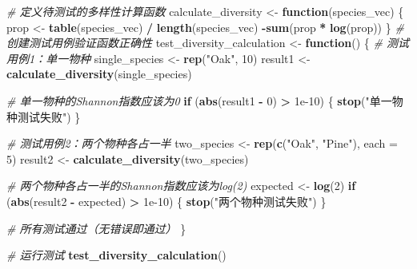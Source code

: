 \documentclass[
  twoside,12pt,fontset=none]{ctexbook}
\newenvironment{Shaded}{\begin{snugshade}}{\end{snugshade}}
\newcommand{\AttributeTok}[1]{\textcolor[rgb]{0.13,0.29,0.53}{#1}}
\newcommand{\CommentTok}[1]{\textcolor[rgb]{0.56,0.35,0.01}{\textit{#1}}}
\newcommand{\ControlFlowTok}[1]{\textcolor[rgb]{0.13,0.29,0.53}{\textbf{#1}}}
\newcommand{\DecValTok}[1]{\textcolor[rgb]{0.00,0.00,0.81}{#1}}
\newcommand{\FloatTok}[1]{\textcolor[rgb]{0.00,0.00,0.81}{#1}}
\newcommand{\FunctionTok}[1]{\textcolor[rgb]{0.13,0.29,0.53}{\textbf{#1}}}
\newcommand{\NormalTok}[1]{#1}
\newcommand{\OtherTok}[1]{\textcolor[rgb]{0.56,0.35,0.01}{#1}}
\newcommand{\SpecialCharTok}[1]{\textcolor[rgb]{0.81,0.36,0.00}{\textbf{#1}}}
\newcommand{\StringTok}[1]{\textcolor[rgb]{0.31,0.60,0.02}{#1}}
\begin{document}
\begin{Shaded}
\begin{Highlighting}[]
\CommentTok{\# 定义待测试的多样性计算函数}
\NormalTok{calculate\_diversity }\OtherTok{\textless{}{-}} \ControlFlowTok{function}\NormalTok{(species\_vec) \{}
\NormalTok{  prop }\OtherTok{\textless{}{-}} \FunctionTok{table}\NormalTok{(species\_vec) }\SpecialCharTok{/} \FunctionTok{length}\NormalTok{(species\_vec)}
  \SpecialCharTok{{-}}\FunctionTok{sum}\NormalTok{(prop }\SpecialCharTok{*} \FunctionTok{log}\NormalTok{(prop))}
\NormalTok{\}}
\CommentTok{\# 创建测试用例验证函数正确性}
\NormalTok{test\_diversity\_calculation }\OtherTok{\textless{}{-}} \ControlFlowTok{function}\NormalTok{() \{}
  \CommentTok{\# 测试用例1：单一物种}
\NormalTok{  single\_species }\OtherTok{\textless{}{-}} \FunctionTok{rep}\NormalTok{(}\StringTok{"Oak"}\NormalTok{, }\DecValTok{10}\NormalTok{)}
\NormalTok{  result1 }\OtherTok{\textless{}{-}} \FunctionTok{calculate\_diversity}\NormalTok{(single\_species)}

  \CommentTok{\# 单一物种的Shannon指数应该为0}
  \ControlFlowTok{if}\NormalTok{ (}\FunctionTok{abs}\NormalTok{(result1 }\SpecialCharTok{{-}} \DecValTok{0}\NormalTok{) }\SpecialCharTok{\textgreater{}} \FloatTok{1e{-}10}\NormalTok{) \{}
    \FunctionTok{stop}\NormalTok{(}\StringTok{"单一物种测试失败"}\NormalTok{)}
\NormalTok{  \}}

  \CommentTok{\# 测试用例2：两个物种各占一半}
\NormalTok{  two\_species }\OtherTok{\textless{}{-}} \FunctionTok{rep}\NormalTok{(}\FunctionTok{c}\NormalTok{(}\StringTok{"Oak"}\NormalTok{, }\StringTok{"Pine"}\NormalTok{), }\AttributeTok{each =} \DecValTok{5}\NormalTok{)}
\NormalTok{  result2 }\OtherTok{\textless{}{-}} \FunctionTok{calculate\_diversity}\NormalTok{(two\_species)}

  \CommentTok{\# 两个物种各占一半的Shannon指数应该为log(2)}
\NormalTok{  expected }\OtherTok{\textless{}{-}} \FunctionTok{log}\NormalTok{(}\DecValTok{2}\NormalTok{)}
  \ControlFlowTok{if}\NormalTok{ (}\FunctionTok{abs}\NormalTok{(result2 }\SpecialCharTok{{-}}\NormalTok{ expected) }\SpecialCharTok{\textgreater{}} \FloatTok{1e{-}10}\NormalTok{) \{}
    \FunctionTok{stop}\NormalTok{(}\StringTok{"两个物种测试失败"}\NormalTok{)}
\NormalTok{  \}}

  \CommentTok{\# 所有测试通过（无错误即通过）}
\NormalTok{\}}

\CommentTok{\# 运行测试}
\FunctionTok{test\_diversity\_calculation}\NormalTok{()}
\end{Highlighting}
\end{Shaded}
\end{document}
